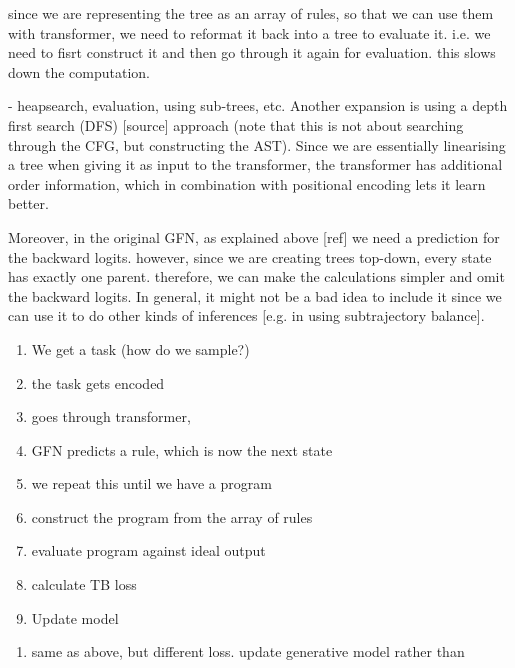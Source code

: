 since we are representing the tree as an array of rules, so that we can use them with transformer, we need to reformat it back into a tree to evaluate it. i.e. we need to fisrt construct it and then go through it again for evaluation. this slows down the computation. 


- heapsearch, evaluation, using sub-trees, etc. 
Another expansion is using a depth first search (DFS) [source] approach (note that this is not about searching through the CFG, but constructing the AST). Since we are essentially linearising a tree when giving it as input to the transformer, the transformer has additional order information, which in combination with positional encoding lets it learn better. 

Moreover, in the original GFN, as explained above [ref] we need a prediction for the backward logits. however, since we are creating trees top-down, every state has exactly one parent. therefore, we can make the calculations simpler and omit the backward logits. 
In general, it might not be a bad idea to include it since we can use it to do other kinds of inferences [e.g. in using subtrajectory balance].






\begin{enumerate}
    \item We get a task (how do we sample?)
    \item the task gets encoded
    \item goes through transformer, 
    \item GFN predicts a rule, which is now the next state
    \item we repeat this until we have a program
    \item construct the program from the array of rules
    \item evaluate program against ideal output
    \item calculate TB loss
    \item Update model
\end{enumerate}
\begin{enumerate}
    \item same as above, but different loss. update generative model rather than 
\end{enumerate}

